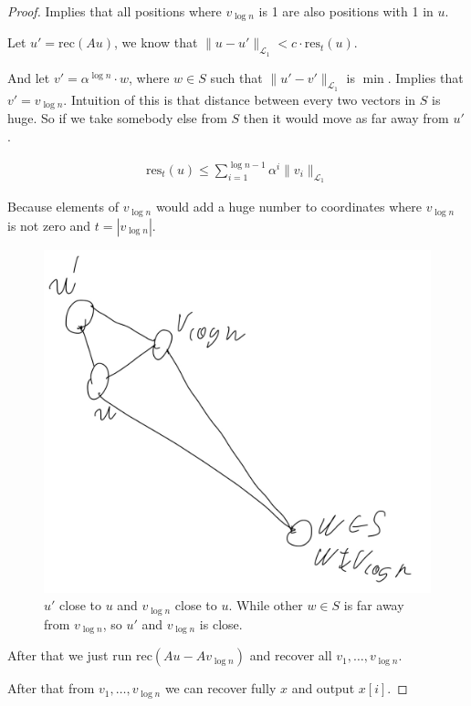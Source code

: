 \begin{proof}
	Implies that all positions where $v_{\log n}$ is 1 are also positions with 1 in $u$.
	
	Let $u' = \text{rec}(Au)$, we know that $\|u - u'\|_{\mathcal L_1} < c \cdot \text{res}_t(u)$.
	
	And let $v' = \alpha^{\log n} \cdot w$, where $w \in S$ such that $\| u' - v' \|_{\mathcal L_1}$ is $\min$.
	Implies that $v' = v_{\log n}$. Intuition of this is that distance between every two vectors in $S$ is huge. So if we take somebody else from $S$ then it would move as far away from $u'$.
	
	\begin{align*}
		\text{res}_t(u) \leq \sum_{i = 1}^{\log  n - 1} \alpha^i \|v_i\|_{\mathcal L_1}
	\end{align*}
	
	Because elements of $v_{\log n}$ would add a huge number to coordinates where $v_{\log n}$ is not zero and $t = |v_{\log n}|$.
	
		\begin{figure}[H]
		\centering
		\includegraphics[width=0.4\linewidth]{figures/proof_cssr_distances.jpeg}
		\caption{$u'$ close to $u$ and $v_{\log n}$ close to $u$. While other $w \in S$ is far away from $v_{\log n}$, so $u'$ and $v_{\log n}$ is close.}
		\label{fig:proof_cssr_distances}
	\end{figure}
	
	After that we just run $\text{rec}(Au - A v_{\log n})$ and recover all $v_1, \ldots, v_{\log n}$.
	
	After that from $v_1, \ldots, v_{\log n}$ we can recover fully $x$ and output $x[i]$.
\end{proof}



